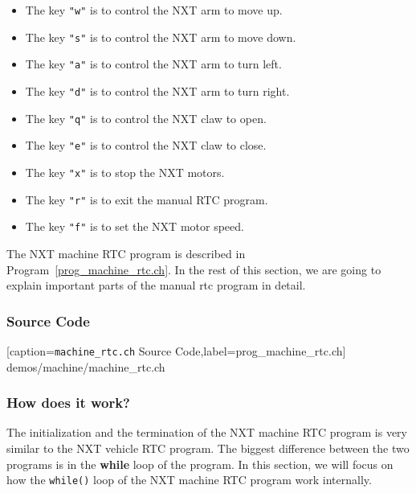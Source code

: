 \documentclass[11pt]{article}
\begin{document}
\begin{itemize}
\item The key \verb+"w"+ is to control the NXT arm to move up.
\item The key \verb+"s"+ is to control the NXT arm to move down.
\item The key \verb+"a"+ is to control the NXT arm to turn left.
\item The key \verb+"d"+ is to control the NXT arm to turn right.
\item The key \verb+"q"+ is to control the NXT claw to open.
\item The key \verb+"e"+ is to control the NXT claw to close.
\item The key \verb+"x"+ is to stop the NXT motors.
\item The key \verb+"r"+ is to exit the manual RTC program.
\item The key \verb+"f"+ is to set the NXT motor speed.
\end{itemize}
The NXT machine RTC program is described in Program~\ref{prog_machine_rtc.ch}. In the rest of this section, 
we are going to explain important parts of the manual rtc program in detail.

\subsubsection*{Source Code}

[caption={{\tt machine\_rtc.ch} Source Code},label=prog_machine_rtc.ch]
{demos/machine/machine_rtc.ch}

\subsubsection*{How does it work?}
The initialization and the termination of the NXT machine RTC program is very 
similar to the NXT vehicle RTC program. The biggest difference between the two 
programs is in the {\bf while} loop of the program. In this section, we will 
focus on how the {\tt while()} loop of the NXT machine RTC program work 
internally.
\end{document}
